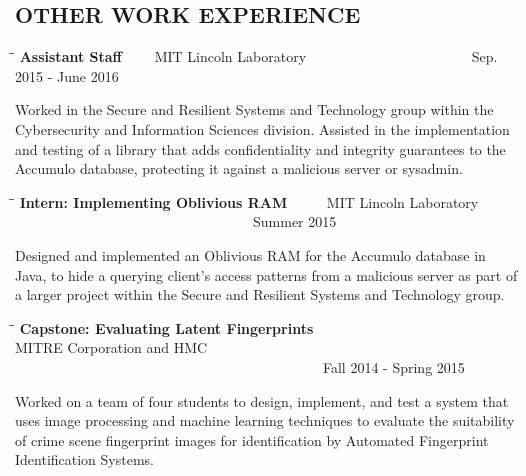 \documentclass{res}
\begin{document}
\begin{resume}
\section{OTHER WORK EXPERIENCE}
\vspace{0in}
    \begin{tabbing}
   \hspace{3in}\=  \hspace{1.63in}\= \kill %
    {\bf Assistant Staff} \>~~~~MIT Lincoln Laboratory \>~~~~~~~~~~~~~~~~~~~~~~~Sep. 2015 - June 2016\\                       
   \end{tabbing}\vspace{-30pt}      %
    Worked in the Secure and Resilient Systems and Technology group within the Cybersecurity and Information Sciences division.  Assisted in the implementation and testing of a library that adds confidentiality and integrity guarantees to the Accumulo database, protecting it against a malicious server or sysadmin.

   \begin{tabbing}
   \hspace{3in}\=  \hspace{1.63in}\= \kill %
    {\bf Intern: Implementing Oblivious RAM} \>~~~~~MIT Lincoln Laboratory \>~~~~~~~~~~~~~~~~~~~~~~~~~~~~~~~~~~Summer 2015\\                       
   \end{tabbing}\vspace{-30pt}      %
    Designed and implemented an Oblivious RAM for the Accumulo database in Java, to hide a querying client's access patterns from a malicious server as part of a larger project within the Secure and Resilient Systems and Technology group.

   \begin{tabbing}
   \hspace{2in}\=  \hspace{1.63in}\= \kill %
    {\bf Capstone: Evaluating Latent Fingerprints} \>~~~~~~~~~~~~~~~~~~~~~~~~~ MITRE Corporation
    and HMC  \>~~~~~~~~~~~~~~~~~~~~~~~~~~~~~~~~~~~~~~~~~~~~Fall 2014 - Spring 2015\\                       
   \end{tabbing}\vspace{-30pt}      %
    Worked on a team of four students to design, implement, and test a system that uses image processing and machine learning techniques to evaluate the suitability of crime scene fingerprint images for identification by Automated Fingerprint Identification Systems.


\end{resume}
\end{document}
